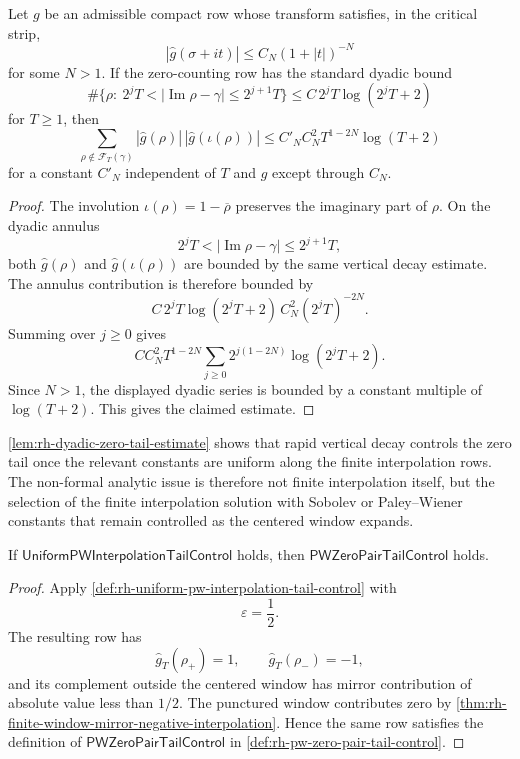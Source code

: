\begin{lemma}
\label{lem:rh-dyadic-zero-tail-estimate}
Let $g$ be an admissible compact row whose transform satisfies, in the
critical strip,
$$
|\widehat g(\sigma+it)|
\le
C_N(1+|t|)^{-N}
$$
for some $N>1$.  If the zero-counting row has the standard dyadic bound
$$
\#\{\rho:\ 2^jT<|\operatorname{Im}\rho-\gamma|\le2^{j+1}T\}
\le
C\,2^jT\log(2^jT+2)
$$
for $T\ge1$, then
$$
\sum_{\rho\notin\mathcal F_T(\gamma)}
|\widehat g(\rho)|\,
|\widehat g(\iota(\rho))|
\le
C'_N C_N^2 T^{1-2N}\log(T+2)
$$
for a constant $C'_N$ independent of $T$ and $g$ except through $C_N$.
\end{lemma}

\begin{proof}
The involution $\iota(\rho)=1-\overline{\rho}$ preserves the imaginary
part of $\rho$.  On the dyadic annulus
$$
2^jT<|\operatorname{Im}\rho-\gamma|\le2^{j+1}T,
$$
both $\widehat g(\rho)$ and $\widehat g(\iota(\rho))$ are bounded by
the same vertical decay estimate.  The annulus contribution is therefore
bounded by
$$
C\,2^jT\log(2^jT+2)\,
C_N^2(2^jT)^{-2N}.
$$
Summing over $j\ge0$ gives
$$
C C_N^2 T^{1-2N}
\sum_{j\ge0}
2^{j(1-2N)}\log(2^jT+2).
$$
Since $N>1$, the displayed dyadic series is bounded by a constant
multiple of $\log(T+2)$.  This gives the claimed estimate.
\end{proof}

\begin{principle}
\label{prin:rh-pw-uniformity-is-analytic-load}
\autoref{lem:rh-dyadic-zero-tail-estimate} shows that rapid vertical
decay controls the zero tail once the relevant constants are uniform
along the finite interpolation rows.  The non-formal analytic issue is
therefore not finite interpolation itself, but the selection of the
finite interpolation solution with Sobolev or Paley--Wiener constants
that remain controlled as the centered window expands.
\end{principle}

\begin{theorem}
\label{thm:rh-uniform-tail-row-gives-pw-zero-pair-tail-control}
If $\mathsf{UniformPWInterpolationTailControl}$ holds, then
$\mathsf{PWZeroPairTailControl}$ holds.
\end{theorem}

\begin{proof}
Apply
\autoref{def:rh-uniform-pw-interpolation-tail-control} with
$$
\varepsilon=\frac12.
$$
The resulting row has
$$
\widehat g_T(\rho_+)=1,
\qquad
\widehat g_T(\rho_-)=-1,
$$
and its complement outside the centered window has mirror contribution
of absolute value less than $1/2$.  The punctured window contributes
zero by
\autoref{thm:rh-finite-window-mirror-negative-interpolation}.  Hence the
same row satisfies the definition of
$\mathsf{PWZeroPairTailControl}$ in
\autoref{def:rh-pw-zero-pair-tail-control}.
\end{proof}

